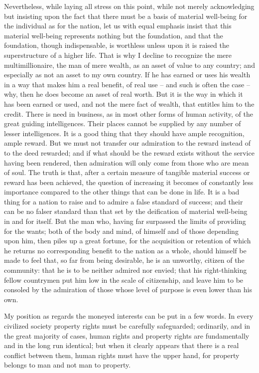 \documentclass[a4paper]{amsbook}
\begin{document}
Nevertheless, while laying all stress on this point, while not merely acknowledging but insisting upon the fact that there must be a basis of material well-being for the individual as for the nation, let us with equal emphasis insist that this material well-being represents nothing but the foundation, and that the foundation, though indispensable, is worthless unless upon it is raised the superstructure of a higher life. That is why I decline to recognize the mere multimillionaire, the man of mere wealth, as an asset of value to any country; and especially as not an asset to my own country. If he has earned or uses his wealth in a way that makes him a real benefit, of real use – and such is often the case – why, then he does become an asset of real worth. But it is the way in which it has been earned or used, and not the mere fact of wealth, that entitles him to the credit. There is need in business, as in most other forms of human activity, of the great guiding intelligences. Their places cannot be supplied by any number of lesser intelligences. It is a good thing that they should have ample recognition, ample reward. But we must not transfer our admiration to the reward instead of to the deed rewarded; and if what should be the reward exists without the service having been rendered, then admiration will only come from those who are mean of soul. The truth is that, after a certain measure of tangible material success or reward has been achieved, the question of increasing it becomes of constantly less importance compared to the other things that can be done in life. It is a bad thing for a nation to raise and to admire a false standard of success; and their can be no falser standard than that set by the deification of material well-being in and for itself. But the man who, having far surpassed the limits of providing for the wants; both of the body and mind, of himself and of those depending upon him, then piles up a great fortune, for the acquisition or retention of which he returns no corresponding benefit to the nation as a whole, should himself be made to feel that, so far from being desirable, he is an unworthy, citizen of the community: that he is to be neither admired nor envied; that his right-thinking fellow countrymen put him low in the scale of citizenship, and leave him to be consoled by the admiration of those whose level of purpose is even lower than his own.

My position as regards the moneyed interests can be put in a few words. In every civilized society property rights must be carefully safeguarded; ordinarily, and in the great majority of cases, human rights and property rights are fundamentally and in the long run identical; but when it clearly appears that there is a real conflict between them, human rights must have the upper hand, for property belongs to man and not man to property.
\end{document}
